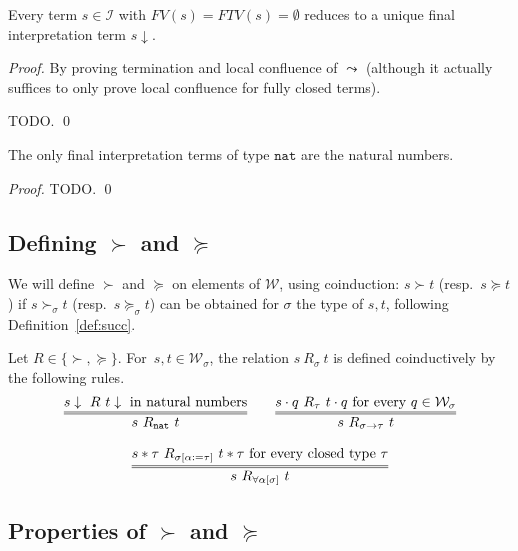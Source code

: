 \documentclass[runningheads,a4paper]{llncs}
\newcommand{\Iterms}{\mathcal{I}}
\newcommand{\World}{\mathcal{W}}
\newcommand{\app}[2]{#1 \cdot #2}
\newcommand{\tapp}[2]{#1 * #2}
\newcommand{\subst}[2]{#1:=#2}
\newcommand{\FTV}{\mathit{FTV}}
\newcommand{\FV}{\mathit{FV}}
\newcommand{\nat}{\mathtt{nat}}
\newcommand{\da}{\downarrow}
\begin{document}
\begin{lemma}
Every term $s \in \Iterms$ with $\FV(s) = \FTV(s) = \emptyset$ reduces
to a unique final interpretation term $s\downarrow$.
\end{lemma}

\begin{proof}
By proving termination and local confluence of $\leadsto$ (although it
actually suffices to only prove local confluence for fully closed terms).

TODO.
\qed
\end{proof}

\begin{lemma}
The only final interpretation terms of type $\nat$ are the natural
numbers.
\end{lemma}

\begin{proof}
TODO.
\qed
\end{proof}

\subsection{Defining $\succ$ and $\succeq$}

We will define $\succ$ and $\succeq$ on elements of $\World$, using
coinduction: $s \succ t$ (resp.\ $s \succeq t$) if $s \succ_\sigma t$
(resp.\ $s \succeq_\sigma t$) can be obtained for $\sigma$ the type of
$s,t$, following Definition~\ref{def:succ}.

\begin{definition}\label{def:succ}
  Let $R \in \{ \succ,\succeq \}$. For~$s,t \in \World_\sigma$, the
  relation $s\ R_{\sigma}\ t$ is defined coinductively by the
  following rules.
  \[
    \begin{array}{c}
    \infer={s\ R_\nat\ t}{s\da\ R\ t\da \text{ in natural
        numbers}}\quad\quad
    \infer={s\ R_{\sigma\to\tau}\ t}{\app{s}{q}\ R_{\tau}\ \app{t}{q}
      \text{ for every } q \in \World_\sigma} \\ \\
    \infer={s\ R_{\forall\alpha[\sigma]}\ t}{\tapp{s}{\tau}\ R_{\sigma[\subst{\alpha}{\tau}]}\ \tapp{t}{\tau}
      \text{ for every closed type } \tau}
    \end{array}
  \]
\end{definition}

\subsection{Properties of $\succ$ and $\succeq$}
\end{document}
